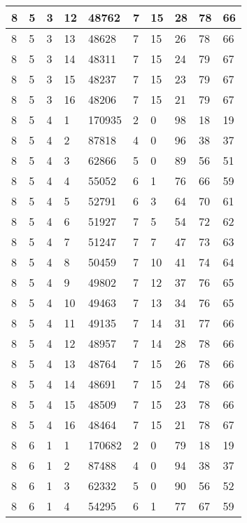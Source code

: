 \begin{table}[!ht]
\begin{tabular}{|l|l|l|l|l|l|l|l|l|l|}
        8 & 5 & 3 & 12 & 48762 & 7 & 15 & 28 & 78 & 66 \\ \hline
        8 & 5 & 3 & 13 & 48628 & 7 & 15 & 26 & 78 & 66 \\ \hline
        8 & 5 & 3 & 14 & 48311 & 7 & 15 & 24 & 79 & 67 \\ \hline
        8 & 5 & 3 & 15 & 48237 & 7 & 15 & 23 & 79 & 67 \\ \hline
        8 & 5 & 3 & 16 & 48206 & 7 & 15 & 21 & 79 & 67 \\ \hline
        8 & 5 & 4 & 1 & 170935 & 2 & 0 & 98 & 18 & 19 \\ \hline
        8 & 5 & 4 & 2 & 87818 & 4 & 0 & 96 & 38 & 37 \\ \hline
        8 & 5 & 4 & 3 & 62866 & 5 & 0 & 89 & 56 & 51 \\ \hline
        8 & 5 & 4 & 4 & 55052 & 6 & 1 & 76 & 66 & 59 \\ \hline
        8 & 5 & 4 & 5 & 52791 & 6 & 3 & 64 & 70 & 61 \\ \hline
        8 & 5 & 4 & 6 & 51927 & 7 & 5 & 54 & 72 & 62 \\ \hline
        8 & 5 & 4 & 7 & 51247 & 7 & 7 & 47 & 73 & 63 \\ \hline
        8 & 5 & 4 & 8 & 50459 & 7 & 10 & 41 & 74 & 64 \\ \hline
        8 & 5 & 4 & 9 & 49802 & 7 & 12 & 37 & 76 & 65 \\ \hline
        8 & 5 & 4 & 10 & 49463 & 7 & 13 & 34 & 76 & 65 \\ \hline
        8 & 5 & 4 & 11 & 49135 & 7 & 14 & 31 & 77 & 66 \\ \hline
        8 & 5 & 4 & 12 & 48957 & 7 & 14 & 28 & 78 & 66 \\ \hline
        8 & 5 & 4 & 13 & 48764 & 7 & 15 & 26 & 78 & 66 \\ \hline
        8 & 5 & 4 & 14 & 48691 & 7 & 15 & 24 & 78 & 66 \\ \hline
        8 & 5 & 4 & 15 & 48509 & 7 & 15 & 23 & 78 & 66 \\ \hline
        8 & 5 & 4 & 16 & 48464 & 7 & 15 & 21 & 78 & 67 \\ \hline
        8 & 6 & 1 & 1 & 170682 & 2 & 0 & 79 & 18 & 19 \\ \hline
        8 & 6 & 1 & 2 & 87488 & 4 & 0 & 94 & 38 & 37 \\ \hline
        8 & 6 & 1 & 3 & 62332 & 5 & 0 & 90 & 56 & 52 \\ \hline
        8 & 6 & 1 & 4 & 54295 & 6 & 1 & 77 & 67 & 59 \\ \hline

\end{tabular}
\end{table}
